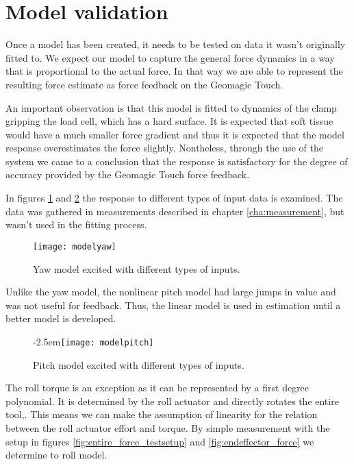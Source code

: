 \section{Model validation} \label{se:mdval}
Once a model has been created, it needs to be tested on data it wasn't originally fitted to.
We expect our model to capture the general force dynamics in a way that is proportional to the actual force.
In that way we are able to represent the resulting force estimate as force feedback on the Geomagic Touch.

An important observation is that this model is fitted to dynamics of the clamp gripping the load cell, which has a hard surface.
It is expected that soft tissue would have a much smaller force gradient and thus it is expected that the model response overestimates the force slightly.
Nontheless, through the use of the system we came to a conclusion that the response is satisfactory for the degree of accuracy provided by the Geomagic Touch force feedback.

In figures \ref{fig:final_res_yaw} and \ref{fig:final_res_pitch} the response to different types of input data is examined.
The data was gathered in measurements described in chapter \ref{cha:measurement}, but wasn't used in the fitting process.


\begin{figure}[H]
\hspace{-2.5em}\texttt{[image: modelyaw]}
\caption{Yaw model excited with different types of inputs.}
\label{fig:final_res_yaw}
\end{figure}

Unlike the yaw model, the nonlinear pitch model had large jumps in value and was not useful for feedback.
Thus, the linear model is used in estimation until a better model is developed.

\begin{figure}[H]
{-2.5em}\texttt{[image: modelpitch]}
\caption{Pitch model excited with different types of inputs.}
\label{fig:final_res_pitch}
\end{figure}

The roll torque is an exception as it can be represented by a first degree polynomial.
It is determined by the roll actuator and directly rotates the entire tool,.
This means we can make the assumption of linearity for the relation between the roll actuator effort and torque.  
By simple measurement with the setup in figures \ref{fig:entire_force_testsetup} and \ref{fig:endeffector_force} we determine to roll model.

